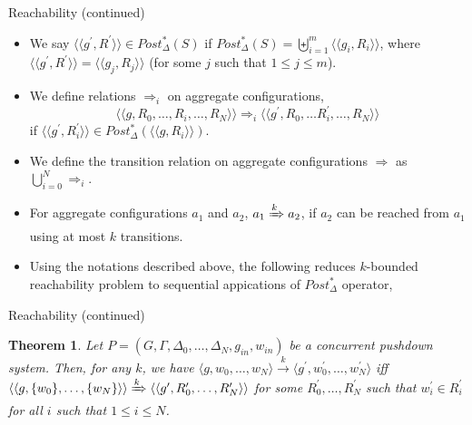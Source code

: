 \documentclass[10pt,notheorems]{beamer}
\theoremstyle{plain} %
\newtheorem{theorem}{Theorem}
\begin{document}
\begin{frame}{Reachability (continued)}
    \begin{itemize}
        \item We say $\langle\langle g^{\prime},R^{\prime}\rangle\rangle\in Post^*_{\Delta}(S)$ if $Post^*_{\Delta}(S)=\biguplus_{i=1}^m \langle\langle g_i,R_i\rangle\rangle$,
        where $\langle\langle g^{\prime},R^{\prime}\rangle\rangle=\langle\langle g_j,R_j\rangle\rangle$ (for some $j$ such that $1\leq j\leq m$).
        \item We define relations $\Rightarrow_i$ on aggregate configurations,
        \[\langle\langle g,R_0,\dots ,R_i,\dots ,R_N\rangle\rangle\Rightarrow_i \langle\langle g^{\prime},R_0,\dots R^{\prime}_i,\dots,R_N\rangle\rangle\]
        if $\langle\langle g^{\prime},R^{\prime}_i\rangle\rangle\in Post_{\Delta}^*(\langle\langle g,R_i\rangle\rangle)$.
        \item We define the transition relation on aggregate configurations $\Rightarrow$ as $\bigcup_{i=0}^N\Rightarrow_i$.
        \item For aggregate configurations $a_1$ and $a_2$, $a_1\xRightarrow{k}a_2$, if $a_2$ can be reached from 
        $a_1$ using at most $k$ transitions.
        \item Using the notations described above, the following reduces
        $k$-bounded reachability problem to sequential appications of $Post_{\Delta}^*$ operator,
    \end{itemize}
\end{frame}
\begin{frame}{Reachability (continued)}
    \begin{theorem}\label{thm2}
        Let $P=(G,\Gamma,\Delta_0,\dots,\Delta_N,g_{in},w_{in})$ be a concurrent pushdown system.
        Then, for any $k$, we have $\langle g,w_0,\dots,w_N\rangle\xrightarrow{k} \langle g^{\prime},w^{\prime}_0,\dots,w^{\prime}_N\rangle$ iff
        $\langle\langle g,\{w_0\},\dots,\{w_N\}\rangle\rangle \xRightarrow{k} \langle\langle g^{\prime},R^{\prime}_0,\dots,R^{\prime}_N\rangle\rangle$ 
        for some $R^{\prime}_0,\dots, R^{\prime}_N$ such that $w^{\prime}_i\in R^{\prime}_i$ for all $i$ such that $1\leq i\leq N$.
    \end{theorem}
\end{frame}
\end{document}
